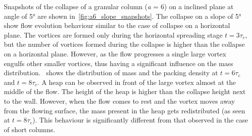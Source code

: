 Snapshots of the collapse of a granular column (\textit{a} = 6) on a inclined 
plane at angle of 5\si{\degree} are shown in~\cref{fig:a6_slope_snapshots}. 
The collapse on a slope of 5\si{\degree} show flow evolution behaviour similar 
to the case of collapse on a horizontal plane. The vortices are formed only 
during the horizontal spreading stage $t = 3\tau_c$, but the number of vortices 
formed during the collapse is higher than the collapse on a horizontal plane. 
However, as the flow progresses a single large vortex engulfs other smaller 
vortices, thus having a significant influence on the mass 
distribution.~ shows 
the distribution of mass and the packing density at $t = 6\tau_c$ and $t = 
8\tau_c$. A heap can be observed in front of the large vortex almost at the 
middle of the flow. The height of the heap is higher than the collapse height 
next to the wall. However, when the flow comes to rest and the vortex moves 
away from the flowing surface, the mass present in the heap gets redistributed 
(as seen at $t = 8\tau_c$). This behaviour is significantly different from that 
observed in the case of short columns. 

